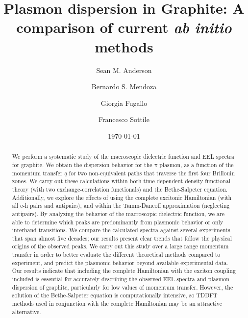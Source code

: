 \documentclass[aps,prb,10pt,showpacs,superscriptaddress,twocolumn,notitlepage]{revtex4-1}
\begin{document}
\title{Plasmon dispersion in Graphite: A comparison of current \emph{ab initio}
methods}
\author{Sean M. Anderson}
\author{Bernardo S. Mendoza}%
\author{Giorgia Fugallo}%
\author{Francesco Sottile}%
\date{\today}

\begin{abstract}
We perform a systematic study of the macroscopic dielectric function and EEL
spectra for graphite. We obtain the dispersion behavior for the $\pi$ plasmon,
as a function of the momentum transfer $q$ for two non-equivalent
paths that traverse the first four Brillouin zones. We carry out these
calculations within both time-dependent density functional theory (with two
exchange-correlation functionals) and the Bethe-Salpeter equation. Additionally,
we explore the effects of using the complete excitonic Hamiltonian (with all e-h
pairs and antipairs), and within the Tamm-Dancoff approximation (neglecting
antipairs).
By analyzing the behavior of the macroscopic dielectric function, we are able to
determine which peaks are predominantly from plasmonic behavior or only
interband transitions. We compare the calculated spectra against several
experiments that span almost five decades; our results present clear trends that
follow the physical origins of the observed peaks.
We carry out this study over a large range momentum transfer in order to better
evaluate the different theoretical methods compared to experiment, and predict
the plasmonic behavior beyond available experimental data.
Our results indicate that including the complete Hamiltonian with the exciton
coupling included is essential for accurately describing the observed EEL
spectra and plasmon dispersion of graphite, particularly for low values of
momentum transfer. However, the solution of the Bethe-Salpeter equation is
computationally intensive, so TDDFT methods used in conjunction with the
complete Hamiltonian may be an attractive alternative.
\end{abstract}
\end{document}

